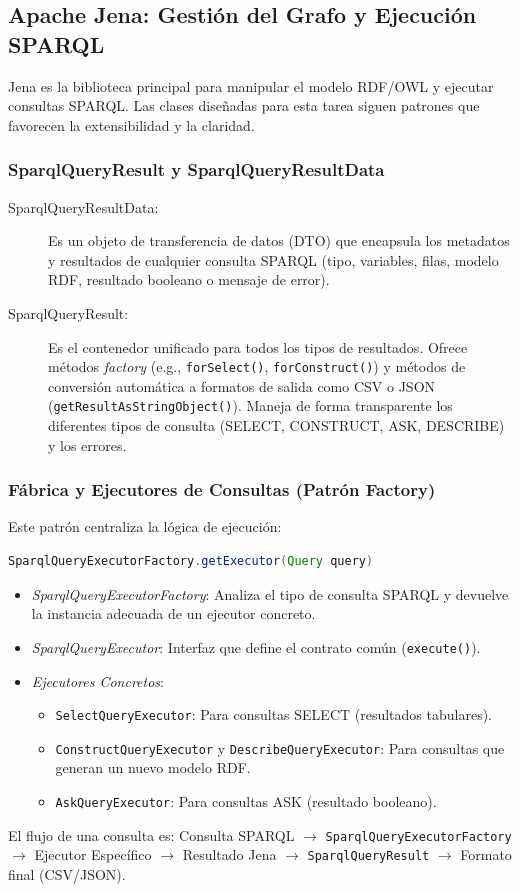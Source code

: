 \documentclass{article}
\begin{document}
\subsection{Apache Jena: Gestión del Grafo y Ejecución SPARQL}
Jena es la biblioteca principal para manipular el modelo RDF/OWL y ejecutar consultas SPARQL. Las clases diseñadas para esta tarea siguen patrones que favorecen la extensibilidad y la claridad.

\subsubsection{SparqlQueryResult y SparqlQueryResultData}
\begin{description}
    \item[SparqlQueryResultData:] Es un objeto de transferencia de datos (DTO) que encapsula los metadatos y resultados de cualquier consulta SPARQL (tipo, variables, filas, modelo RDF, resultado booleano o mensaje de error).
    \item[SparqlQueryResult:] Es el contenedor unificado para todos los tipos de resultados. Ofrece métodos \textit{factory} (e.g., \texttt{forSelect()}, \texttt{forConstruct()}) y métodos de conversión automática a formatos de salida como CSV o JSON (\texttt{getResultAsStringObject()}). Maneja de forma transparente los diferentes tipos de consulta (SELECT, CONSTRUCT, ASK, DESCRIBE) y los errores.
\end{description}

\subsubsection{Fábrica y Ejecutores de Consultas (Patrón Factory)}
Este patrón centraliza la lógica de ejecución:
\begin{lstlisting}[language=Java, basicstyle=\small\ttfamily]
SparqlQueryExecutorFactory.getExecutor(Query query)
\end{lstlisting}
\begin{itemize}
    \item \textit{SparqlQueryExecutorFactory}: Analiza el tipo de consulta SPARQL y devuelve la instancia adecuada de un ejecutor concreto.
    \item \textit{SparqlQueryExecutor}: Interfaz que define el contrato común (\texttt{execute()}).
    \item \textit{Ejecutores Concretos}:
    \begin{itemize}
        \item \texttt{SelectQueryExecutor}: Para consultas SELECT (resultados tabulares).
        \item \texttt{ConstructQueryExecutor} y \texttt{DescribeQueryExecutor}: Para consultas que generan un nuevo modelo RDF.
        \item \texttt{AskQueryExecutor}: Para consultas ASK (resultado booleano).
    \end{itemize}
\end{itemize}
El flujo de una consulta es: Consulta SPARQL $\rightarrow$ \texttt{SparqlQueryExecutorFactory} $\rightarrow$ Ejecutor Específico $\rightarrow$ Resultado Jena $\rightarrow$ \texttt{SparqlQueryResult} $\rightarrow$ Formato final (CSV/JSON).
\end{document}
